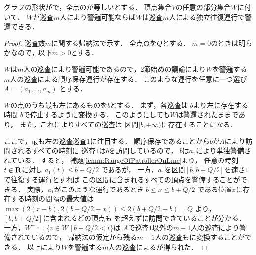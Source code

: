 \begin{lemm}
\label{lemm:LineEqualTimelimitIndependentInterval}
グラフの形状が{\graphLine}で，全点の{\maxIdletime}が等しいとする．
頂点集合$V$の任意の部分集合$W$に付いて、
$W$が巡査$m$人により警邏可能ならば$W$は巡査$m$人による独立往復運行で警邏できる．
\end{lemm}
\begin{proof}
\newcommand{\leftmostpoint}{b}  %
\newcommand{\newpatroller}{l}
\newcommand{\leftmostpatroller}{巡査1}
\newcommand{\leftmostpatOpr}{a_1}

巡査数$m$に関する帰納法で示す．
全点の{\maxIdletime}を$Q$とする．
$m = 0$のときは明らかなので，以下$m > 0$とする．

$W$は$m$人の巡査により警邏可能であるので，2節始めの議論により$W$を警邏する$m$人の巡査による順序保存運行が存在する．
このような運行を任意に一つ選び
$A = (a _1, \ldots, a _m)$
とする．

$W$の点のうち最も左にあるものを$\leftmostpoint$とする．
まず，各巡査は
$\leftmostpoint$より左に存在する時間
$\leftmostpoint$で停止するように変換する．
このようにしても$W$は警邏されたままであり，
また，これによりすべての巡査は
区間$[\leftmostpoint, +\infty)$に存在することになる．

ここで，最も左の巡査$\leftmostpatroller$に注目する．
順序保存であることから$\leftmostpoint$が$A$により訪問されるすべての時刻に
$\leftmostpatroller$は$\leftmostpoint$を訪問しているので，
$\leftmostpoint$は$\leftmostpatOpr$により単独警備されている．
%
すると，
補題\ref{lemm:RangeOfPatrollerOnLine}より，
任意の時刻$t \in \mathbf R$に対し
$\leftmostpatOpr(t) \leq \leftmostpoint + Q/2$
であるが，
%
一方，$\leftmostpatOpr$を区間$[b, b + Q/2]$を速さ$1$で往復する運行とすれば
この区間に含まれるすべての頂点を警備することができる．
実際，$\leftmostpatOpr$がこのような運行であるとき
$\leftmostpoint \leq x \leq \leftmostpoint + Q/2$
である位置$x$に存在する時刻の間隔の最大値は
$ \max( 2(x - \leftmostpoint), 2(\leftmostpoint + Q/2 - x) )
  \leq 2(\leftmostpoint + Q/2 - \leftmostpoint) = Q $
より，$[\leftmostpoint, \leftmostpoint + Q/2]$に含まれるどの頂点も
{\maxIdletime}を超えずに訪問できていることが分かる．
%
一方，$W^- := \{ v \in W \mid \leftmostpoint + Q/2 < v \}$は
$A$で$\leftmostpatroller$以外の$m - 1$人の巡査により警備されているので，
帰納法の仮定から残る$m - 1$人の巡査も{\indSectOperation}に変換することができる．
以上により$W$を警邏する$m$人の巡査による{\indSectOperation}が得られた．
\end{proof}


